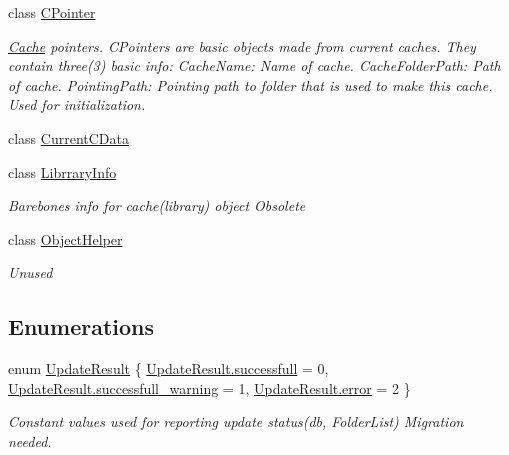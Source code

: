 \begin{DoxyCompactItemize}
class \mbox{\hyperlink{classOSML_1_1Cache_1_1CPointer}{C\+Pointer}}
\begin{DoxyCompactList}\small\item\em \mbox{\hyperlink{namespaceOSML_1_1Cache}{Cache}} pointers. C\+Pointers are basic objects made from current caches. They contain three(3) basic info\+: Cache\+Name\+: Name of cache. Cache\+Folder\+Path\+: Path of cache. Pointing\+Path\+: Pointing path to folder that is used to make this cache. Used for initialization. \end{DoxyCompactList}\item 
class \mbox{\hyperlink{classOSML_1_1Cache_1_1CurrentCData}{Current\+C\+Data}}
\item 
class \mbox{\hyperlink{classOSML_1_1Cache_1_1LibrraryInfo}{Librrary\+Info}}
\begin{DoxyCompactList}\small\item\em Barebones info for cache(library) object Obsolete \end{DoxyCompactList}\item 
class \mbox{\hyperlink{classOSML_1_1Cache_1_1ObjectHelper}{Object\+Helper}}
\begin{DoxyCompactList}\small\item\em Unused \end{DoxyCompactList}\end{DoxyCompactItemize}
\subsection*{Enumerations}
\begin{DoxyCompactItemize}
\item 
enum \mbox{\hyperlink{namespaceOSML_1_1Cache_aeff1659e13b8ebe939aafedcd5f9fed7}{Update\+Result}} \{ \mbox{\hyperlink{namespaceOSML_1_1Cache_aeff1659e13b8ebe939aafedcd5f9fed7aadab3ef1833d5a927a519930b29c1c03}{Update\+Result.\+successfull}} = 0, 
\mbox{\hyperlink{namespaceOSML_1_1Cache_aeff1659e13b8ebe939aafedcd5f9fed7ab8c1503b9f640b4f35636151c94a4fa3}{Update\+Result.\+successfull\+\_\+warning}} = 1, 
\mbox{\hyperlink{namespaceOSML_1_1Cache_aeff1659e13b8ebe939aafedcd5f9fed7acb5e100e5a9a3e7f6d1fd97512215282}{Update\+Result.\+error}} = 2
 \}
\begin{DoxyCompactList}\small\item\em Constant values used for reporting update status(db, Folder\+List) Migration needed. \end{DoxyCompactList}\end{DoxyCompactItemize}


